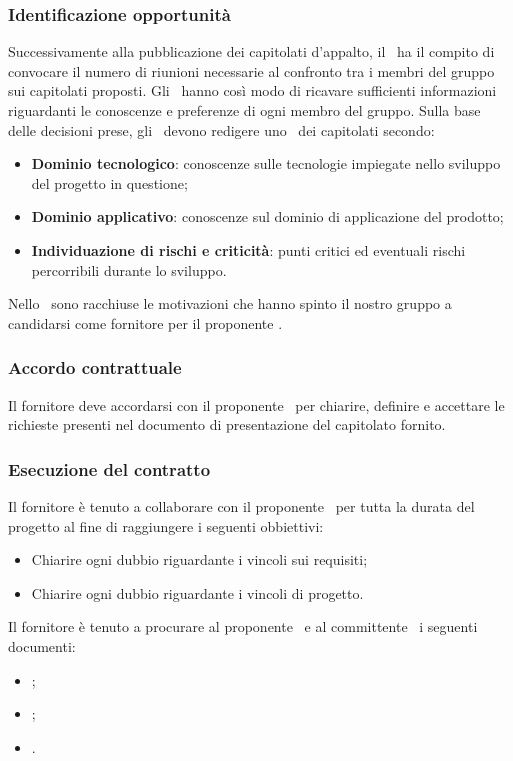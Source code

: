 \documentclass[../NormeDiProgetto.tex]{subfiles}
\begin{document}
			\subsubsection{Identificazione opportunità}
				Successivamente alla pubblicazione dei capitolati d'appalto, il
				\responsabilediprogetto\ ha il compito di convocare il numero
				di riunioni necessarie al confronto tra i membri del gruppo sui
				capitolati proposti. Gli \analisti\ hanno così modo di ricavare sufficienti
				informazioni riguardanti le conoscenze e preferenze di ogni
				membro del gruppo. Sulla base delle decisioni prese, gli
				\analisti\ devono redigere uno \studiodifattibilita\
				dei capitolati secondo:
				\begin{itemize}
					\item \textbf{Dominio tecnologico}: conoscenze sulle
					tecnologie impiegate nello sviluppo del progetto in questione;
					\item \textbf{Dominio applicativo}: conoscenze sul dominio di
					applicazione del prodotto;
					\item \textbf{Individuazione di rischi e criticità}: punti
					critici ed eventuali rischi percorribili durante lo sviluppo.
				\end{itemize}
				Nello \studiodifattibilitav\ sono racchiuse le motivazioni che hanno spinto il nostro
				gruppo a candidarsi come fornitore per il proponente \proponente.
			\subsubsection{Accordo contrattuale}
				Il fornitore deve accordarsi con il proponente \proponente\ per chiarire, definire e
				accettare le richieste presenti nel documento di presentazione del capitolato fornito.
			\subsubsection{Esecuzione del contratto}
				Il fornitore è tenuto a collaborare con il proponente \proponente\ per tutta la durata
				del progetto al fine di raggiungere i seguenti obbiettivi:
				\begin{itemize}
					\item Chiarire ogni dubbio riguardante i vincoli sui requisiti;
					\item Chiarire ogni dubbio riguardante i vincoli di progetto.
				\end{itemize}
				Il fornitore è tenuto a procurare al proponente \proponente\ e al committente
				\vardanega\ i seguenti documenti:
				\begin{itemize}
					\item \pianodiprogetto;
					\item \analisideirequisiti;
					\item \pianodiqualifica.
				\end{itemize}
\end{document}
